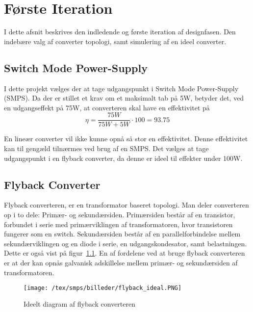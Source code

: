
\chapter{Første Iteration}
I dette afsnit beskrives den indledende og første iteration af designfasen. Den indebære valg af converter topologi, samt simulering af en ideel converter.

\section{Switch Mode Power-Supply}
I dette projekt vælges der at tage udgangspunkt i Switch Mode Power-Supply (SMPS). Da der er stillet et krav om et maksimalt tab på 5W, betyder det, ved en udgangseffekt på 75W, at converteren skal have en effektivitet på
\begin{equation}
	\eta = \frac{75W}{75W + 5W} \cdot 100 = 93.75
\end{equation}

En lineær converter vil ikke kunne opnå så stor en effektivitet. Denne effektivitet kan til gengæld tilnærmes ved brug af en SMPS. Det vælges at tage udgangspunkt i en flyback converter, da denne er ideel til effekter under 100W. 


\section{Flyback Converter}
Flyback converteren, er en transformator baseret topologi. Man deler converteren op i to dele: Primær- og sekundærsiden. Primærsiden består af en transistor, forbundet i serie med primærviklingen af transformatoren, hvor transistoren fungerer som en switch. Sekundærsiden består af en parallelforbindelse mellem sekundærviklingen og en diode i serie, en udgangskondesator, samt belastningen. Dette er også vist på figur~\ref{fig:flyback_ideal}. En af fordelene ved at bruge flyback converteren er at der kan opnås galvanisk adskillelse mellem primær- og sekundærsiden af transformatoren. 

\begin{figure}[H]
	\center
	\texttt{[image: /tex/smps/billeder/flyback\_ideal.PNG]}
	\caption{Ideelt diagram af flyback converteren
	\cite{SMPS-topologies}}
	\label{fig:flyback_ideal}
\end{figure} 

